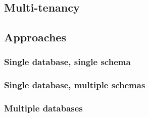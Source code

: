 \subsection{Multi-tenancy}

\subsection{Approaches}

\subsubsection{Single database, single schema}

\subsubsection{Single database, multiple schemas}

\subsubsection{Multiple databases}

